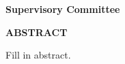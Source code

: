 \newpage
{}

\noindent \textbf{Supervisory Committee}
\tpbreak
\panel %

\begin{center}
\textbf{ABSTRACT}
\end{center}

Fill in abstract.
